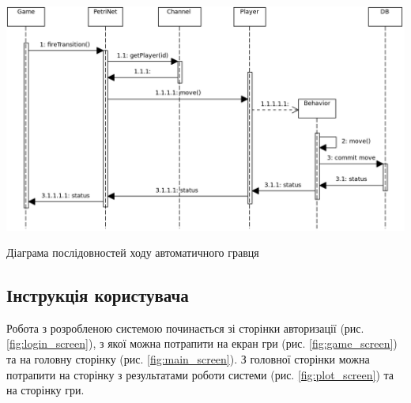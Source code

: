 \begin{stdfigure}
    \includegraphics[width=7in]{images/uml/automate_move.png}
    \caption{Діаграма послідовностей ходу автоматичного гравця}
    \label{fig:uml_auto_move}
\end{stdfigure}   

\subsection{Інструкція користувача}
Робота з розробленою системою починається зі сторінки авторизації (рис. \ref{fig:login_screen}), з якої можна потрапити на екран гри (рис. \ref{fig:game_screen}) та на головну сторінку (рис. \ref{fig:main_screen}). З головної сторінки можна потрапити на сторінку з результатами роботи системи (рис. \ref{fig:plot_screen}) та на сторінку гри. 

